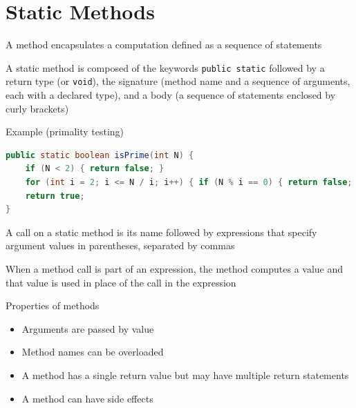 \documentclass[8pt,a4paper,compress]{beamer}
\begin{document}
\section{Static Methods}
\begin{frame}[fragile]
\pause

A method encapsulates a computation defined as a sequence of statements

\pause
\bigskip

A static method is composed of the keywords \lstinline{public static} followed by a return type (or \lstinline{void}), the signature (method name and a sequence of arguments, each with a declared type), and a body (a sequence of statements enclosed by curly brackets)

\pause
\bigskip

Example (primality testing)
\begin{lstlisting}[language=Java]
public static boolean isPrime(int N) {
    if (N < 2) { return false; }
    for (int i = 2; i <= N / i; i++) { if (N % i == 0) { return false; } }
    return true;
}
\end{lstlisting}

\pause
\bigskip

A call on a static method is its name followed by expressions that specify argument values in parentheses, separated by commas

\pause
\bigskip

When a method call is part of an expression, the method computes a value and that value is used in place of the call in the expression

\pause
\bigskip

Properties of methods
\begin{itemize}
\item Arguments are passed by value
\item Method names can be overloaded 
\item A method has a single return value but may have multiple return statements
\item A method can have side effects
\end{itemize}
\end{frame}
\end{document}
